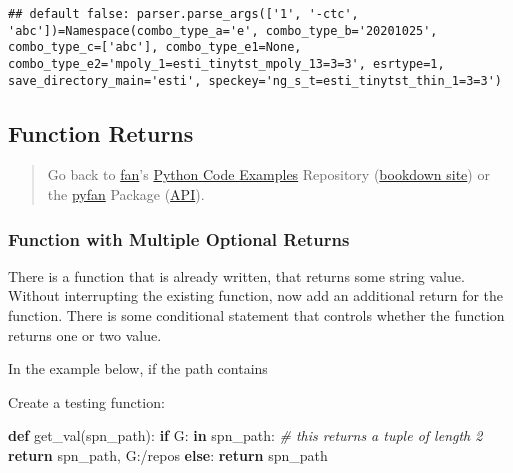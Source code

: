 \documentclass[
]{book}
\newenvironment{Shaded}{\begin{snugshade}}{\end{snugshade}}
\newcommand{\CommentTok}[1]{\textcolor[rgb]{0.56,0.35,0.01}{\textit{#1}}}
\newcommand{\ControlFlowTok}[1]{\textcolor[rgb]{0.13,0.29,0.53}{\textbf{#1}}}
\newcommand{\KeywordTok}[1]{\textcolor[rgb]{0.13,0.29,0.53}{\textbf{#1}}}
\newcommand{\NormalTok}[1]{#1}
\newcommand{\StringTok}[1]{\textcolor[rgb]{0.31,0.60,0.02}{#1}}
\begin{document}
\begin{verbatim}
## default false: parser.parse_args(['1', '-ctc', 'abc'])=Namespace(combo_type_a='e', combo_type_b='20201025', combo_type_c=['abc'], combo_type_e1=None, combo_type_e2='mpoly_1=esti_tinytst_mpoly_13=3=3', esrtype=1, save_directory_main='esti', speckey='ng_s_t=esti_tinytst_thin_1=3=3')
\end{verbatim}

\hypertarget{function-returns}{%
\subsection{Function Returns}\label{function-returns}}

\begin{quote}
Go back to \href{http://fanwangecon.github.io/}{fan}'s \href{https://fanwangecon.github.io/Py4Econ/}{Python Code Examples} Repository (\href{https://fanwangecon.github.io/Py4Econ/bookdown}{bookdown site}) or the \href{https://pyfan.readthedocs.io/en/latest/}{pyfan} Package (\href{https://pyfan.readthedocs.io/en/latest/reference.html}{API}).
\end{quote}

\hypertarget{function-with-multiple-optional-returns}{%
\subsubsection{Function with Multiple Optional Returns}\label{function-with-multiple-optional-returns}}

There is a function that is already written, that returns some string value. Without interrupting the existing function, now add an additional return for the function. There is some conditional statement that controls whether the function returns one or two value.

In the example below, if the path contains

Create a testing function:

\begin{Shaded}
\begin{Highlighting}[]
\KeywordTok{def}\NormalTok{ get\_val(spn\_path):}
    \ControlFlowTok{if} \StringTok{\textquotesingle{}G:\textquotesingle{}} \KeywordTok{in}\NormalTok{ spn\_path:}
        \CommentTok{\# this returns a tuple of length 2}
        \ControlFlowTok{return}\NormalTok{ spn\_path, }\StringTok{\textquotesingle{}G:/repos\textquotesingle{}}
    \ControlFlowTok{else}\NormalTok{:}
        \ControlFlowTok{return}\NormalTok{ spn\_path}
\end{Highlighting}
\end{Shaded}
\end{document}
